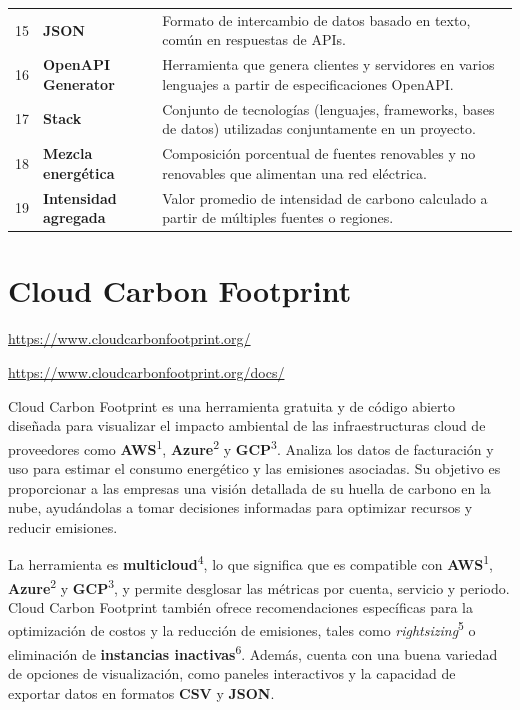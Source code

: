 \documentclass[12pt,a4paper]{report}
\begin{document}
\begin{table}[h]
\begin{tabular}{@{}cll@{}}
15 & \textbf{JSON} & Formato de intercambio de datos basado en texto, común en respuestas de APIs. \\
16 & \textbf{OpenAPI Generator} & Herramienta que genera clientes y servidores en varios lenguajes a partir de especificaciones OpenAPI. \\
17 & \textbf{Stack} & Conjunto de tecnologías (lenguajes, frameworks, bases de datos) utilizadas conjuntamente en un proyecto. \\
18 & \textbf{Mezcla energética} & Composición porcentual de fuentes renovables y no renovables que alimentan una red eléctrica. \\
19 & \textbf{Intensidad agregada} & Valor promedio de intensidad de carbono calculado a partir de múltiples fuentes o regiones. \\
\bottomrule
\end{tabular}
\end{table}

\section*{Cloud Carbon Footprint}

\href{https://www.cloudcarbonfootprint.org/}{https://www.cloudcarbonfootprint.org/}

\href{https://www.cloudcarbonfootprint.org/docs/}{https://www.cloudcarbonfootprint.org/docs/}

Cloud Carbon Footprint es una herramienta gratuita y de código abierto diseñada para visualizar el impacto ambiental de las infraestructuras cloud de proveedores como \textbf{AWS}\textsuperscript{1}, \textbf{Azure}\textsuperscript{2} y \textbf{GCP}\textsuperscript{3}. Analiza los datos de facturación y uso para estimar el consumo energético y las emisiones asociadas. Su objetivo es proporcionar a las empresas una visión detallada de su huella de carbono en la nube, ayudándolas a tomar decisiones informadas para optimizar recursos y reducir emisiones.

La herramienta es \textbf{multicloud}\textsuperscript{4}, lo que significa que es compatible con \textbf{AWS}\textsuperscript{1}, \textbf{Azure}\textsuperscript{2} y \textbf{GCP}\textsuperscript{3}, y permite desglosar las métricas por cuenta, servicio y periodo. Cloud Carbon Footprint también ofrece recomendaciones específicas para la optimización de costos y la reducción de emisiones, tales como \textit{rightsizing}\textsuperscript{5} o eliminación de \textbf{instancias inactivas}\textsuperscript{6}. Además, cuenta con una buena variedad de opciones de visualización, como paneles interactivos y la capacidad de exportar datos en formatos \textbf{CSV} y \textbf{JSON}.
\end{document}
